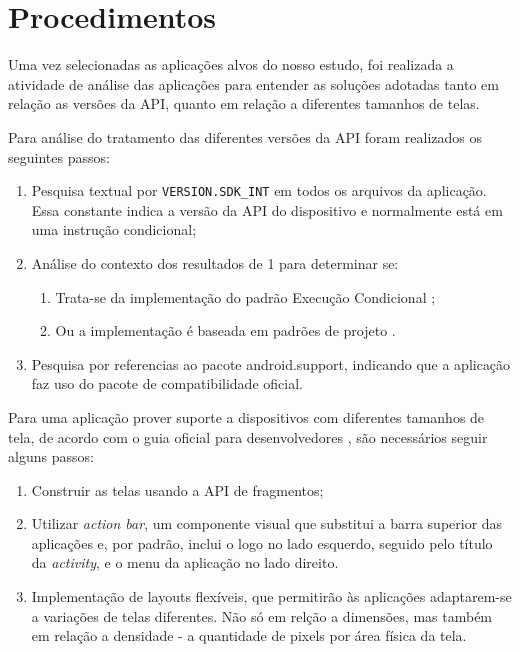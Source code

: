 \section{Procedimentos}
\label{sec:procedimentos}
Uma vez selecionadas as aplicações alvos do nosso estudo, foi realizada a atividade
de análise das aplicações para entender as soluções adotadas tanto em relação
as versões da API, quanto em relação a diferentes tamanhos de telas.

Para análise do tratamento das diferentes versões da API foram realizados os seguintes passos: 
\begin{enumerate}
    \item Pesquisa textual por \texttt{VERSION.SDK\_INT} em todos os arquivos da
        aplicação.
        Essa constante indica a versão da API do dispositivo e normalmente está
        em uma instrução condicional;
    \item Análise do contexto dos resultados de 1 para determinar se:
        \begin{enumerate}
            \item Trata-se da implementação do padrão Execução Condicional \cite{Santos2012};
            \item Ou a implementação é baseada em padrões de projeto \cite{Gamma1994}. 
        \end{enumerate}
    \item Pesquisa por referencias ao pacote android.support, indicando que a aplicação 
        faz uso do pacote de compatibilidade oficial.
\end{enumerate}

Para uma aplicação prover suporte a dispositivos com diferentes tamanhos de tela,
de acordo com o guia oficial para desenvolvedores \cite{supporting_tablets},
são necessários seguir alguns passos:
\begin{enumerate}
    \item Construir as telas usando a API de fragmentos;
    \item Utilizar \textit{action bar}, um componente visual que substitui a barra
        superior
        das aplicações e, por padrão, inclui o logo no lado esquerdo, seguido pelo
        título da \textit{activity},  e o menu da aplicação no lado direito.
    \item Implementação de layouts flexíveis, que permitirão às aplicações
        adaptarem-se a variações de telas diferentes. Não só em relção a dimensões,
        mas também em relação a densidade - a quantidade de pixels por área física
        da tela.    
\end{enumerate}

